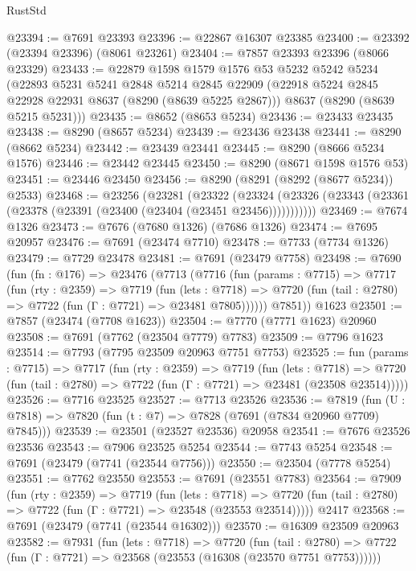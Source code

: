 \begin{lexlean}{RustStd}
\begin{coremodule}
@23394 := @7691 @23393
@23396 := @22867 @16307 @23385
@23400 := @23392 (@23394 @23396) (@8061 @23261)
@23404 := @7857 @23393 @23396 (@8066 @23329)
@23433 := @22879
    @1598
    @1579
    @1576
    @53
    @5232
    @5242
    @5234
    (@22893
      @5231
      @5241
      @2848
      @5214
      @2845
      @22909
      (@22918 @5224 @2845 @22928 @22931 @8637 (@8290 (@8639 @5225 @2867)))
      @8637
      (@8290 (@8639 @5215 @5231)))
@23435 := @8652 (@8653 @5234)
@23436 := @23433 @23435
@23438 := @8290 (@8657 @5234)
@23439 := @23436 @23438
@23441 := @8290 (@8662 @5234)
@23442 := @23439 @23441
@23445 := @8290 (@8666 @5234 @1576)
@23446 := @23442 @23445
@23450 := @8290 (@8671 @1598 @1576 @53)
@23451 := @23446 @23450
@23456 := @8290 (@8291 (@8292 (@8677 @5234)) @2533)
@23468 := @23256
    (@23281
      (@23322
        (@23324 (@23326 (@23343 (@23361 (@23378 (@23391 (@23400 (@23404 (@23451 @23456)))))))))))
@23469 := @7674 @1326
@23473 := @7676 (@7680 @1326) (@7686 @1326)
@23474 := @7695 @20957
@23476 := @7691 (@23474 @7710)
@23478 := @7733 (@7734 @1326)
@23479 := @7729 @23478
@23481 := @7691 (@23479 @7758)
@23498 := @7690
    (fun (fn : @176) =>
    @23476
      (@7713
        (@7716
          (fun (params : @7715) =>
          @7717
            (fun (rty : @2359) =>
            @7719
              (fun (lets : @7718) =>
              @7720 (fun (tail : @2780) => @7722 (fun (Γ : @7721) => @23481 @7805))))))
        @7851))
    @1623
@23501 := @7857 (@23474 (@7708 @1623))
@23504 := @7770 (@7771 @1623) @20960
@23508 := @7691 (@7762 (@23504 @7779) @7783)
@23509 := @7796 @1623
@23514 := @7793 (@7795 @23509 @20963 @7751 @7753)
@23525 := fun (params : @7715) =>
  @7717
    (fun (rty : @2359) =>
    @7719
      (fun (lets : @7718) =>
      @7720 (fun (tail : @2780) => @7722 (fun (Γ : @7721) => @23481 (@23508 @23514)))))
@23526 := @7716 @23525
@23527 := @7713 @23526
@23536 := @7819
    (fun (U : @7818) => @7820 (fun (t : @7) => @7828 (@7691 (@7834 @20960 @7709) @7845)))
@23539 := @23501 (@23527 @23536) @20958
@23541 := @7676 @23526 @23536
@23543 := @7906 @23525 @5254
@23544 := @7743 @5254
@23548 := @7691 (@23479 (@7741 (@23544 @7756)))
@23550 := @23504 (@7778 @5254)
@23551 := @7762 @23550
@23553 := @7691 (@23551 @7783)
@23564 := @7909
    (fun (rty : @2359) =>
    @7719
      (fun (lets : @7718) =>
      @7720 (fun (tail : @2780) => @7722 (fun (Γ : @7721) => @23548 (@23553 @23514)))))
    @2417
@23568 := @7691 (@23479 (@7741 (@23544 @16302)))
@23570 := @16309 @23509 @20963
@23582 := @7931
    (fun (lets : @7718) =>
    @7720
      (fun (tail : @2780) =>
      @7722 (fun (Γ : @7721) => @23568 (@23553 (@16308 (@23570 @7751 @7753))))))

\end{coremodule}
\end{lexlean}
